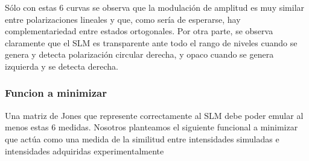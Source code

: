 Sólo con estas 6
curvas se observa que la modulación de amplitud es muy similar entre
polarizaciones lineales y que, como sería de esperarse, hay
complementariedad entre estados ortogonales.  Por otra parte, se
observa claramente que el SLM es transparente ante todo el rango de niveles cuando se genera y
detecta polarización circular derecha, y opaco cuando se genera
izquierda y se detecta derecha.

\subsubsection{Funcion a minimizar}

Una matriz de Jones que represente correctamente al SLM debe poder
emular al menos estas 6 medidas. Nosotros planteamos el siguiente
funcional a minimizar que actúa como una medida de la similitud entre
intensidades simuladas e intensidades adquiridas experimentalmente

